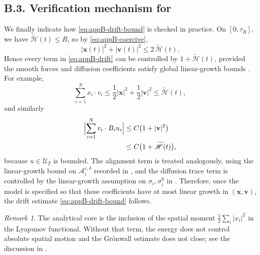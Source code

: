\documentclass[pdflatex,sn-mathphys-num]{sn-jnl}%
\numberwithin{equation}{section}
\theoremstyle{thmstyleone}%
\theoremstyle{remark}
\newtheorem{remark}{Remark}
\theoremstyle{definition}
\newcommand{\calU}{\mathcal{U}}
\begin{document}
\subsection*{B.3. Verification mechanism for }
We finally indicate how \eqref{eq:appB-drift-bound} is checked in
practice. On $[0,\tau_R]$, we have $\widetilde{\mathscr H}(t)\le R$, so by
\eqref{eq:appB-coercive},
\[
  |\mathbf{x}(t)|^2+|\mathbf{v}(t)|^2
  \le 2\,\widetilde{\mathscr H}(t).
\]
Hence every term in \eqref{eq:appB-drift} can be controlled by
$1+\widetilde{\mathscr H}(t)$, provided the smooth forces and diffusion
coefficients satisfy global linear-growth bounds \cite{mao2007stochastic,khasminskii2011stochastic}.
For example,
\[
  \sum_{i=1}^N x_i\cdot v_i
  \le \frac12|\mathbf{x}|^2+\frac12|\mathbf{v}|^2
  \le \widetilde{\mathscr H}(t),
\]
and similarly
\begin{equation*}
\begin{aligned}
  \Bigl|
    \sum_{i=1}^N v_i\cdot B_i u_i
  \Bigr|
  &\le C\bigl(1+|\mathbf{v}|^2\bigr) \\
  &\le C\bigl(1+\widetilde{\mathscr H}(t)\bigr),
\end{aligned}
\end{equation*}
because $u\in\calU_T$ is bounded. The alignment term is treated
analogously, using the linear-growth bound on
$\mathcal A_i^{\varepsilon,\delta}$ recorded in , and the
diffusion trace term is controlled by the linear-growth assumption on
$\sigma_i,\sigma_i^0$ in . Therefore, once the model is
specified so that these coefficients have at most linear growth in
$(\mathbf{x},\mathbf{v})$, the drift estimate \eqref{eq:appB-drift-bound} follows.
\begin{remark}
The analytical core is the inclusion of the spatial moment
$\frac12\sum_i |x_i|^2$ in the Lyapunov functional. Without that term,
the energy does not control absolute spatial motion and the Gr\"onwall
estimate does not close; see the discussion in
.
\end{remark}
\end{document}

